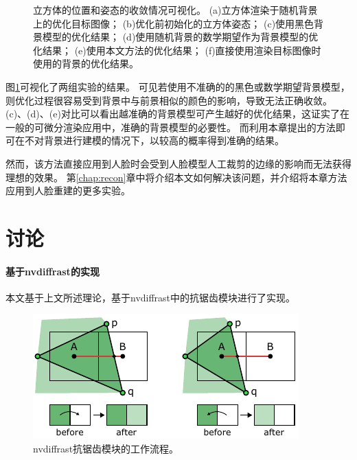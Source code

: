 \begin{figure}
    \caption[立方体的位置和姿态的收敛情况可视化]{
        立方体的位置和姿态的收敛情况可视化。
        (a)立方体渲染于随机背景上的优化目标图像；
        (b)优化前初始化的立方体姿态；
        (c)使用黑色背景模型的优化结果；
        (d)使用随机背景的数学期望作为背景模型的优化结果；
        (e)使用本文方法的优化结果；
        (f)直接使用渲染目标图像时使用的背景的优化结果。
    }
    \label{fig:cube_opt_vis}
\end{figure}
图\ref{fig:cube_opt_vis}可视化了两组实验的结果。
可见若使用不准确的的黑色或数学期望背景模型，则优化过程很容易受到背景中与前景相似的颜色的影响，导致无法正确收敛。
(c)、(d)、(e)对比可以看出越准确的背景模型可产生越好的优化结果，这证实了在一般的可微分渲染应用中，准确的背景模型的必要性。
而利用本章提出的方法即可在不对背景进行建模的情况下，以较高的概率得到准确的结果。

然而，该方法直接应用到人脸时会受到人脸模型人工裁剪的边缘的影响而无法获得理想的效果。
第\ref{chap:recon}章中将介绍本文如何解决该问题，并介绍将本章方法应用到人脸重建的更多实验。

\section{讨论}
\label{sec:method_discuss}

\paragraph{基于nvdiffrast的实现}
本文基于上文所述理论，基于nvdiffrast\citep{nvdiffrast}中的抗锯齿模块进行了实现。

\begin{figure}[ht]
    \centering
    \includegraphics{figures/antialias}
    \caption[nvdiffrast抗锯齿模块的工作流程]{nvdiffrast抗锯齿模块的工作流程\citep{nvdiffrast}。}
    \label{fig:aa}
\end{figure}

